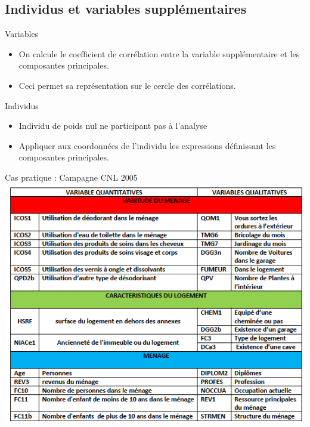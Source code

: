 \documentclass[11pt]{beamer}
\begin{document}
\subsection{Individus et variables supplémentaires }



\begin{frame}{ Variables }

 \begin{itemize}
 \item   On calcule le coefficient de corrélation entre la variable supplémentaire et les composantes principales. 
 
 \item Ceci permet sa représentation sur le cercle des corrélations.
 
 \end{itemize}


\end{frame}


 

\begin{frame}{ Individus }

 \begin{itemize}
 \item   Individu de poids nul ne participant pas à l’analyse  
 
\item Appliquer aux coordonnées de l’individu les expressions
définissant les composantes principales.
 \end{itemize}


\end{frame}


\begin{frame}{ Cas pratique : Campagne CNL 2005}
\centering 
\includegraphics[scale=0.5]{CNL1} 

\end{frame}
\end{document}
